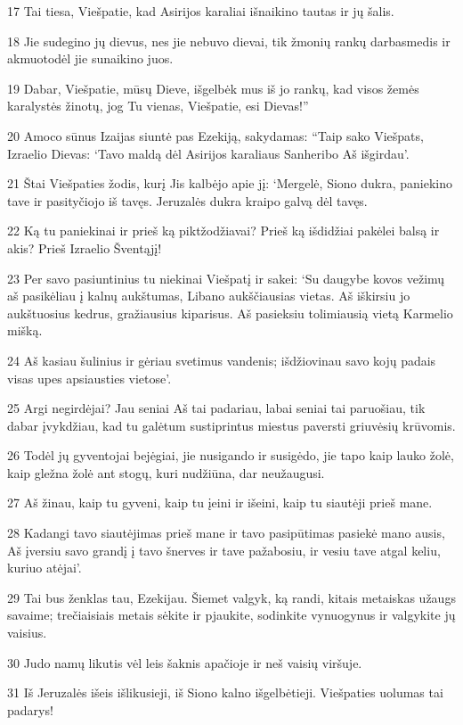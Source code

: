 \par 17 Tai tiesa, Viešpatie, kad Asirijos karaliai išnaikino tautas ir jų šalis. 
\par 18 Jie sudegino jų dievus, nes jie nebuvo dievai, tik žmonių rankų darbas­medis ir akmuo­todėl jie sunaikino juos. 
\par 19 Dabar, Viešpatie, mūsų Dieve, išgelbėk mus iš jo rankų, kad visos žemės karalystės žinotų, jog Tu vienas, Viešpatie, esi Dievas!” 
\par 20 Amoco sūnus Izaijas siuntė pas Ezekiją, sakydamas: “Taip sako Viešpats, Izraelio Dievas: ‘Tavo maldą dėl Asirijos karaliaus Sanheribo Aš išgirdau’. 
\par 21 Štai Viešpaties žodis, kurį Jis kalbėjo apie jį: ‘Mergelė, Siono dukra, paniekino tave ir pasityčiojo iš tavęs. Jeruzalės dukra kraipo galvą dėl tavęs. 
\par 22 Ką tu paniekinai ir prieš ką piktžodžiavai? Prieš ką išdidžiai pakėlei balsą ir akis? Prieš Izraelio Šventąjį! 
\par 23 Per savo pasiuntinius tu niekinai Viešpatį ir sakei: ‘Su daugybe kovos vežimų aš pasikėliau į kalnų aukštumas, Libano aukščiausias vietas. Aš iškirsiu jo aukštuosius kedrus, gražiausius kiparisus. Aš pasieksiu tolimiausią vietą­ Karmelio mišką. 
\par 24 Aš kasiau šulinius ir gėriau svetimus vandenis; išdžiovinau savo kojų padais visas upes apsiausties vietose’. 
\par 25 Argi negirdėjai? Jau seniai Aš tai padariau, labai seniai tai paruošiau, tik dabar įvykdžiau, kad tu galėtum sustiprintus miestus paversti griuvėsių krūvomis. 
\par 26 Todėl jų gyventojai bejėgiai, jie nusigando ir susigėdo, jie tapo kaip lauko žolė, kaip gležna žolė ant stogų, kuri nudžiūna, dar neužaugusi. 
\par 27 Aš žinau, kaip tu gyveni, kaip tu įeini ir išeini, kaip tu siautėji prieš mane. 
\par 28 Kadangi tavo siautėjimas prieš mane ir tavo pasipūtimas pasiekė mano ausis, Aš įversiu savo grandį į tavo šnerves ir tave pažabosiu, ir vesiu tave atgal keliu, kuriuo atėjai’. 
\par 29 Tai bus ženklas tau, Ezekijau. Šiemet valgyk, ką randi, kitais metais­kas užaugs savaime; trečiaisiais metais sėkite ir pjaukite, sodinkite vynuogynus ir valgykite jų vaisius. 
\par 30 Judo namų likutis vėl leis šaknis apačioje ir neš vaisių viršuje. 
\par 31 Iš Jeruzalės išeis išlikusieji, iš Siono kalno išgelbėtieji. Viešpaties uolumas tai padarys! 
